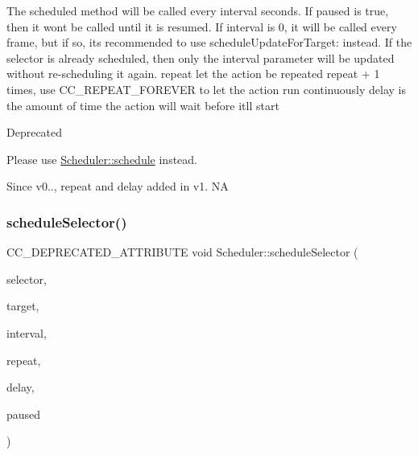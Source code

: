 The scheduled method will be called every \textquotesingle{}interval\textquotesingle{} seconds. If paused is true, then it won\textquotesingle{}t be called until it is resumed. If \textquotesingle{}interval\textquotesingle{} is 0, it will be called every frame, but if so, it\textquotesingle{}s recommended to use \textquotesingle{}schedule\+Update\+For\+Target\+:\textquotesingle{} instead. If the selector is already scheduled, then only the interval parameter will be updated without re-\/scheduling it again. repeat let the action be repeated repeat + 1 times, use C\+C\+\_\+\+R\+E\+P\+E\+A\+T\+\_\+\+F\+O\+R\+E\+V\+ER to let the action run continuously delay is the amount of time the action will wait before it\textquotesingle{}ll start \begin{DoxyRefDesc}{Deprecated}
\item[\hyperlink{deprecated__deprecated000054}{Deprecated}]Please use {\ttfamily \hyperlink{classScheduler_a0d52145629a67e888cf1b25fd01f668b}{Scheduler\+::schedule}} instead. \end{DoxyRefDesc}
\begin{DoxySince}{Since}
v0.., repeat and delay added in v1.  NA 
\end{DoxySince}
\mbox{\label{classScheduler_ae8df7fdf2f74a90cdb37bc334a550360}} 
\subsubsection{\texorpdfstring{schedule\+Selector()}{scheduleSelector()}\hspace{0.1cm}{\footnotesize\ttfamily [2/4]}}
{\footnotesize\ttfamily C\+C\+\_\+\+D\+E\+P\+R\+E\+C\+A\+T\+E\+D\+\_\+\+A\+T\+T\+R\+I\+B\+U\+TE void Scheduler\+::schedule\+Selector (\begin{DoxyParamCaption}\item[{S\+E\+L\+\_\+\+S\+C\+H\+E\+D\+U\+LE}]{selector,  }\item[{\hyperlink{classRef}{Ref} $\ast$}]{target,  }\item[{float}]{interval,  }\item[{unsigned int}]{repeat,  }\item[{float}]{delay,  }\item[{bool}]{paused }\end{DoxyParamCaption})\hspace{0.3cm}{\ttfamily [inline]}}

